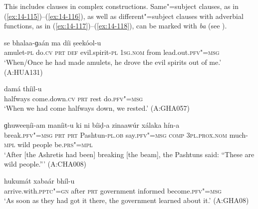 This includes clauses in complex constructions. Same"=subject clauses, as in (\ref{ex:14-115})--(\ref{ex:14-116}), as well as different"=subject clauses with adverbial functions, as in (\ref{ex:14-117})--(\ref{ex:14-118}), can be marked with \textit{ba} (see ).

\begin{exe}
\ex
\label{ex:14-115}
 se bhalaa-ɡaán ma  díi ṣeekóol-u \\
amulet-\textsc{pl} do.\textsc{cv} \textsc{prt} \textsc{def} evil.spirit-\textsc{pl} \textsc{1sg.nom} from lead.out.\textsc{pfv"=msg}{\protect\footnotemark} \\
\glt `When/Once he had made amulets, he drove the evil spirits out of me.' (A:HUA131)

\ex
\label{ex:14-116}
 damá thíil-u \\
halfways come.down.\textsc{cv} \textsc{prt} rest do.\textsc{pfv"=msg } \\
\glt `When we had come halfways down, we rested.' (A:GHA057)

\ex
\label{ex:14-117}
\gll [phooṭóol-u ta ba] ɡhuweeṇíi-am maníit-u  ki ni bíiḍ-a zinaawúr
xálaka  hín-a \\
break.\textsc{pfv"=msg} \textsc{prt} \textsc{prt} Pashtun-\textsc{pl.ob} say.\textsc{pfv"=msg}  \textsc{comp} \textsc{3pl.prox.nom} much-\textsc{mpl} wild people be.\textsc{prs"=mpl } \\
\glt `After [the Ashretis had been] breaking [the beam], the Pashtuns said: ``These are wild people.''' (A:CHA008)

\ex
\label{ex:14-118}
\gll [phedóol"=ii pahúrta ba] hukumát xabaár  bhíl-u \\
arrive.with.\textsc{pptc"=gn} after \textsc{prt} government informed become.\textsc{pfv"=msg} \\
\glt `As soon as they had got it there, the government learned about it.' (A:GHA08)
\end{exe}

